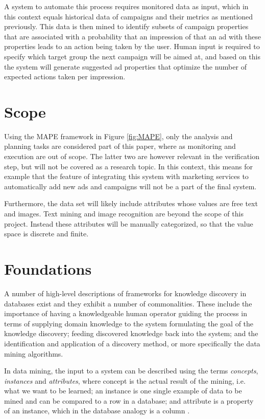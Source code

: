 \documentclass[11pt,a4paper]{report}
\begin{document}
A system to automate this process requires monitored data as input, which in this context equals historical data of campaigns and their metrics as mentioned previously. This data is then mined to identify subsets of campaign properties that are associated with a probability that an impression of that an ad with these properties leads to an action being taken by the user. Human input is required to specify which target group the next campaign will be aimed at, and based on this the system will generate suggested ad properties that optimize the number of expected actions taken per impression.

\section{Scope}
Using the MAPE framework in Figure \ref{fig:MAPE}, only the analysis and planning tasks are considered part of this paper, where as monitoring and execution are out of scope. The latter two are however relevant in the verification step, but will not be covered as a research topic. In this context, this means for example that the feature of integrating this system with marketing services to automatically add new ads and campaigns will not be a part of the final system.

Furthermore, the data set will likely include attributes whose values are free text and images. Text mining and image recognition are beyond the scope of this project. Instead these attributes will be manually categorized, so that the value space is discrete and finite.

\section{Foundations}
A number of high-level descriptions of frameworks for knowledge discovery in databases exist \citep{Fayyad1996, Frawley1992} and they exhibit a number of commonalities. These include the importance of having a knowledgeable human operator guiding the process in terms of supplying domain knowledge to the system formulating the goal of the knowledge discovery; feeding discovered knowledge back into the system; and the identification and application of a discovery method, or more specifically the data mining algorithms.

In data mining, the input to a system can be described using the terms \emph{concepts}, \emph{instances} and \emph{attributes}, where concept is the actual result of the mining, i.e. what we want to be learned; an instance is one single example of data to be mined and can be compared to a row in a database; and attribute is a property of an instance, which in the database analogy is a column \citep{Witten2011}.
\end{document}
